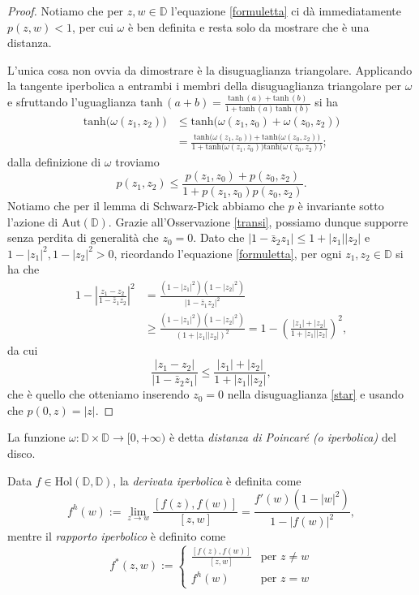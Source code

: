 \begin{proof}
  Notiamo che per $z,w \in \mathbb{D}$ l'equazione \eqref{formuletta} ci dà immediatamente $p(z,w)<1$, per cui $\omega$ è ben definita e resta solo da mostrare che è una distanza.

  L'unica cosa non ovvia da dimostrare è la disuguaglianza triangolare. Applicando la tangente iperbolica a entrambi i membri della disuguaglianza triangolare per $\omega$ e sfruttando l'uguaglianza $\text{tanh}\,(a+b)=\frac{\text{tanh}\,(a)+\text{tanh}\,(b)}{1+\text{tanh}\,(a)\,\text{tanh}\,(b)}$ si ha
  \begin{align*}
    \text{tanh}\bigl(\omega(z_1,z_2)\bigr) & \le \text{tanh}\bigl(\omega(z_1, z_0)+\omega(z_0,z_2)\bigr) \\
    &=\frac{\text{tanh}\bigl(\omega(z_1, z_0)\bigr)+\text{tanh}\bigl(\omega(z_0,z_2)\bigr)}{1+\text{tanh}\bigl(\omega(z_1, z_0)\bigr)\text{tanh}\bigl(\omega(z_0,z_2)\bigr)};
  \end{align*}
  dalla definizione di $\omega$ troviamo
  \begin{equation}
    p(z_1,z_2) \le \frac{p(z_1,z_0)+p(z_0,z_2)}{1+p(z_1,z_0)p(z_0,z_2)}. \label{star}
  \end{equation}
  Notiamo che per il lemma di Schwarz-Pick abbiamo che $p$ è invariante sotto l'azione di $\text{Aut}(\mathbb{D})$. Grazie all'Osservazione \ref{transi}, possiamo dunque supporre senza perdita di generalità che $z_0=0$. Dato che $|1-\bar{z}_2z_1| \le 1+|z_1||z_2|$ e $1-|z_1|^2, 1-|z_2|^2>0$, ricordando l'equazione \eqref{formuletta}, per ogni $z_1, z_2 \in \mathbb{D}$ si ha che
  \begin{align*}
    1-\left|\frac{z_1-z_2}{1-\bar{z}_1z_2}\right|^2 & =\frac{(1-|z_1|^2)(1-|z_2|^2)}{|1-\bar{z}_1z_2|^2} \\
    & \ge \frac{(1-|z_1|^2)(1-|z_2|^2)}{(1+|z_1||z_2|)^2}=1-\left(\frac{|z_1|+|z_2|}{1+|z_1||z_2|}\right)^2,
  \end{align*}
  da cui
  $$\frac{|z_1-z_2|}{|1-\bar{z}_2z_1|} \le \frac{|z_1|+|z_2|}{1+|z_1||z_2|},$$
  che è quello che otteniamo inserendo $z_0=0$ nella disuguaglianza \eqref{star} e usando che $p(0,z)=|z|$.
\end{proof}

\begin{defn}
  La funzione $\omega:\mathbb{D}\times \mathbb{D} \longrightarrow [0,+\infty)$ è detta \textit{distanza di Poincaré (o iperbolica)} del disco.
\end{defn}

\begin{defn}
  Data $f \in \text{Hol}(\mathbb{D},\mathbb{D})$, la \textit{derivata iperbolica} è definita come
  $$f^h(w):=\lim_{z \longrightarrow w} \frac{[f(z),f(w)]}{[z,w]}=\frac{f'(w)(1-|w|^2)}{1-|f(w)|^2},$$
  mentre il \textit{rapporto iperbolico} è definito come
  $$f^*(z,w):=\begin{cases}
    \frac{[f(z),f(w)]}{[z,w]} & \mbox{per }z\not=w \\
    f^h(w) & \mbox{per }z=w
  \end{cases}$$
\end{defn}

